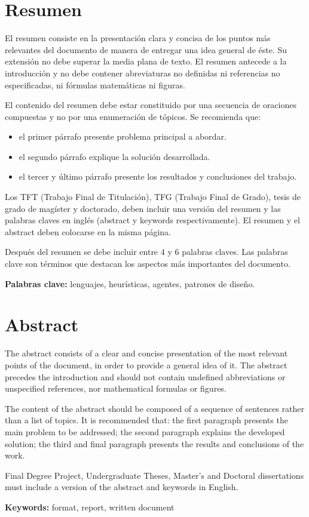\chapter*{Resumen}

El resumen consiste en la presentación clara y concisa de los puntos más relevantes del documento de manera de entregar una idea general de éste. Su extensión no debe superar la media plana de texto. 
El resumen antecede a la introducción y no debe contener abreviaturas no definidas ni referencias no especificadas, ni fórmulas matemáticas ni figuras. 

El contenido del resumen debe estar constituido por una secuencia de oraciones compuestas y no por una enumeración de tópicos. Se recomienda que: 
\begin{itemize}
    \item el primer párrafo presente problema principal a abordar.
    \item el segundo párrafo explique la solución desarrollada.
    \item el tercer y último párrafo presente los resultados y conclusiones del trabajo.
\end{itemize}

Los TFT (Trabajo Final de Titulación), TFG (Trabajo Final de Grado), tesis de grado de magíster y doctorado, deben incluir una versión del resumen y las palabras claves en inglés (abstract y keywords respectivamente). El resumen y el abstract deben colocarse en la misma página.

Después del resumen se debe incluir entre 4 y 6 palabras claves. Las palabras
clave son términos que destacan los aspectos más importantes del documento.

{\bf Palabras clave:} lenguajes, heurísticas, agentes, patrones de diseño.


\vspace{3cm}
\begingroup
\let\clearpage\relax %
\chapter*{Abstract}
The abstract consists of a clear and concise presentation of the most relevant points of the document, in order to provide a general idea of it. The abstract precedes the introduction and should not contain undefined abbreviations or unspecified references, nor mathematical formulas or figures.

The content of the abstract should be composed of a sequence of sentences rather than a list of topics. It is recommended that: the first paragraph presents the main problem to be addressed; the second paragraph explains the developed solution; the third and final paragraph presents the results and conclusions of the work.

Final Degree Project, Undergraduate Theses, Master's and Doctoral dissertations must include a version of the abstract and keywords in English.

{\bf Keywords:} format, report, written document
\endgroup